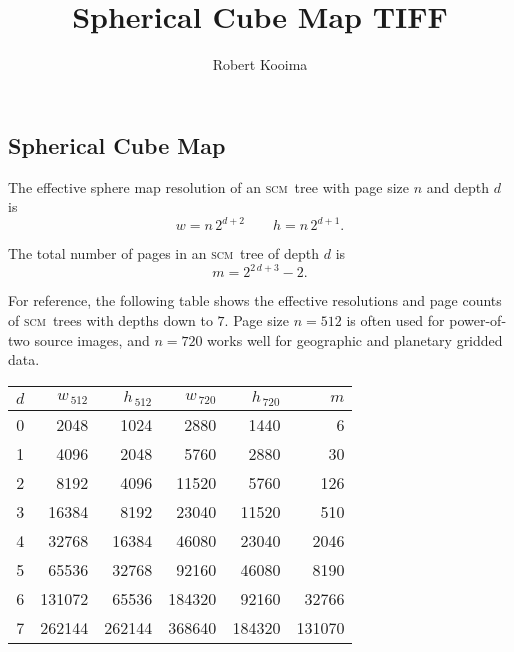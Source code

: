 \documentclass[oneside,11pt]{memoir}
\newcommand{\scm}     {\textsc{scm}}
\newcommand{\B}{\bigstrut[b]}
\newcommand{\T}{\bigstrut[t]}
\begin{document}
\title{Spherical Cube Map TIFF}
\author{Robert Kooima}
\maketitle
\begin{Spacing}{1.1}





\chapter{Spherical Cube Map}

The effective sphere map resolution of an \scm\ tree with page size $n$ and depth $d$ is
\[w=n\,2^{d+2}\qquad h=n\,2^{d+1}.\]

The total number of pages in an \scm\ tree of depth $d$ is
\[m=2^{2\,d+3}-2.\]

For reference, the following table shows the effective resolutions and page counts of \scm\ trees with depths down to $7$. Page size $n=512$ is often used for power-of-two source images, and $n=720$ works well for geographic and planetary gridded data.

\begin{center}
\begin{tabular}{r|rr|rr|r}
$d$& $w_{\,512}$& $h_{\,512}$& $w_{\,720}$& $h_{\,720}$& $m$ \B\\\hline
\num{0}&  \num{2048}&  \num{1024}&  \num{2880}&  \num{1440}&     \num{6} \T\\
\num{1}&  \num{4096}&  \num{2048}&  \num{5760}&  \num{2880}&    \num{30} \\
\num{2}&  \num{8192}&  \num{4096}& \num{11520}&  \num{5760}&   \num{126} \\
\num{3}& \num{16384}&  \num{8192}& \num{23040}& \num{11520}&   \num{510} \\
\num{4}& \num{32768}& \num{16384}& \num{46080}& \num{23040}&  \num{2046} \\
\num{5}& \num{65536}& \num{32768}& \num{92160}& \num{46080}&  \num{8190} \\
\num{6}&\num{131072}& \num{65536}&\num{184320}& \num{92160}& \num{32766} \\
\num{7}&\num{262144}&\num{262144}&\num{368640}&\num{184320}&\num{131070} \\
\end{tabular}
\end{center}


\end{Spacing}
\end{document}
